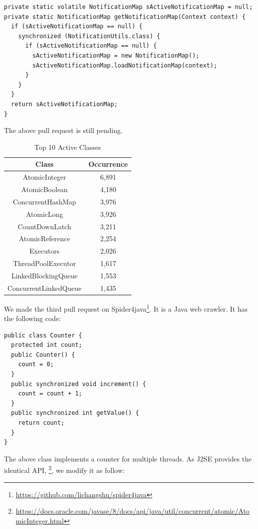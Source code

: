 \begin{lstlisting}
private static volatile NotificationMap sActiveNotificationMap = null;
private static NotificationMap getNotificationMap(Context context) {
  if (sActiveNotificationMap == null) {
    synchronized (NotificationUtils.class) {
      if (sActiveNotificationMap == null) {
        sActiveNotificationMap = new NotificationMap();
        sActiveNotificationMap.loadNotificationMap(context);
      }
    }
  }
  return sActiveNotificationMap;
}
\end{lstlisting}

The above pull request is still pending.
\begin{table}
	\centering
	\caption{Top 10 Active Classes}
	\label{table:topapi}
	\begin{tabular}{|c|c|}\hline
		Class&Occurrence\\\hline
		AtomicInteger&6,891\\
		AtomicBoolean&4,180\\
		ConcurrentHashMap&3,976\\
		AtomicLong&3,926\\
		CountDownLatch&3,211\\
		AtomicReference&2,254\\
		Executors&2,026\\
		ThreadPoolExecutor&1,617\\
		LinkedBlockingQueue&1,553\\
		ConcurrentLinkedQueue&1,435\\\hline
	\end{tabular}
\end{table}

We made the third pull request on Spider4java\footnote{\url{https://github.com/lichangshu/spider4java}}. It is a Java web crawler. It has the following code:


\begin{lstlisting}
public class Counter {
  protected int count;
  public Counter() {
    count = 0;
  }
  public synchronized void increment() {
    count = count + 1;
  }
  public synchronized int getValue() {
    return count;
  }
}
\end{lstlisting}

The above class implements a counter for multiple threads. As J2SE provides the identical API, \footnote{\url{https://docs.oracle.com/javase/8/docs/api/java/util/concurrent/atomic/AtomicInteger.html}}, we modify it as follow:

